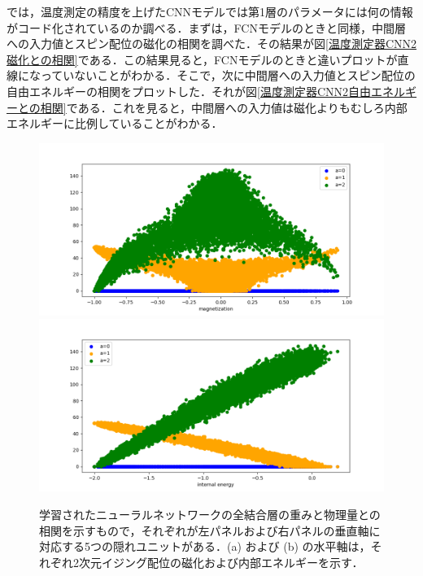 \documentclass[a4paper,11pt]{jsreport}
\begin{document}
では，温度測定の精度を上げたCNNモデルでは第1層のパラメータには何の情報がコード化されているのか調べる．まずは，FCNモデルのときと同様，中間層への入力値とスピン配位の磁化の相関を調べた．その結果が図\ref{温度測定器CNN2磁化との相関}である．この結果見ると，FCNモデルのときと違いプロットが直線になっていないことがわかる．そこで，次に中間層への入力値とスピン配位の自由エネルギーの相関をプロットした．それが図\ref{温度測定器CNN2自由エネルギーとの相関}である．これを見ると，中間層への入力値は磁化よりもむしろ内部エネルギーに比例していることがわかる．\par

\begin{figure}[H]
  \begin{center}
    \includegraphics[width=\linewidth]{image/温度測定器2_L16_CNN_Nh3_mag.png}
    \label{温度測定器CNN2磁化との相関}
    \includegraphics[width=\linewidth]{image/温度測定器2_L16_CNN_Nh3_internal.png}
    \label{温度測定器CNN2内部エネルギーとの相関}
  \end{center}
  \caption{学習されたニューラルネットワークの全結合層の重みと物理量との相関を示すもので，それぞれが左パネルおよび右パネルの垂直軸に対応する5つの隠れユニットがある．(a) および (b) の水平軸は，それぞれ2次元イジング配位の磁化および内部エネルギーを示す．}
\end{figure}
\end{document}
